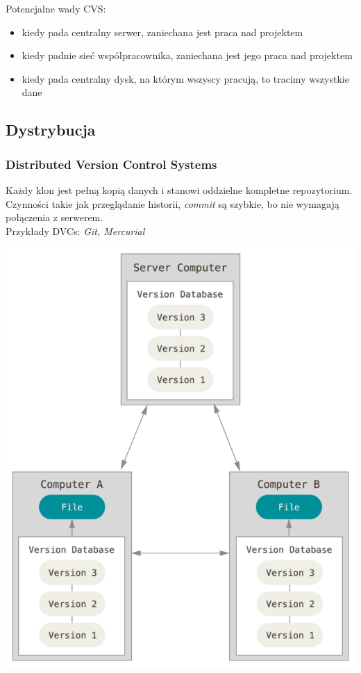 \documentclass{beamer}
\begin{document}
\begin{frame}
  Potencjalne wady CVS:\@
  \begin{itemize}
  \item kiedy pada centralny serwer, zaniechana jest praca nad projektem
  \item kiedy padnie sieć współpracownika, zaniechana jest jego praca nad projektem
  \item kiedy pada centralny dysk, na którym wszyscy pracują, to tracimy wszystkie dane 
 \end{itemize}
\end{frame}

\subsection{Dystrybucja}
\begin{frame}
 \frametitle{\textbf{D}istributed \textbf{V}ersion \textbf{C}ontrol \textbf{S}ystems}
  Każdy klon jest pełną kopią danych i stanowi oddzielne kompletne repozytorium.\\
  Czynności takie jak przeglądanie historii, \textit{commit} są szybkie, bo nie wymagają połączenia z serwerem.
\\
 Przykłady DVCs: \textit{Git, Mercurial}
\end{frame}

\begin{frame}
  \begin{center}
   \includegraphics[height=0.7\textwidth]{./obrazki/fig-1_3.png}
 \end{center} 
\end{frame}
\end{document}
